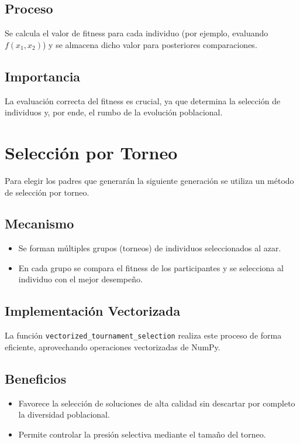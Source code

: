 \subsection*{Proceso}
Se calcula el valor de fitness para cada individuo (por ejemplo, evaluando $f(x_1, x_2)$) y se almacena dicho valor para posteriores comparaciones.

\subsection*{Importancia}
La evaluaci\'on correcta del fitness es crucial, ya que determina la selecci\'on de individuos y, por ende, el rumbo de la evoluci\'on poblacional.

\section{Selecci\'on por Torneo}

Para elegir los padres que generar\'an la siguiente generaci\'on se utiliza un m\'etodo de selecci\'on por torneo.

\subsection*{Mecanismo}
\begin{itemize}
    \item Se forman m\'ultiples grupos (torneos) de individuos seleccionados al azar.
    \item En cada grupo se compara el fitness de los participantes y se selecciona al individuo con el mejor desempe\~no.
\end{itemize}

\subsection*{Implementaci\'on Vectorizada}
La funci\'on \texttt{vectorized\_tournament\_selection} realiza este proceso de forma eficiente, aprovechando operaciones vectorizadas de NumPy.

\subsection*{Beneficios}
\begin{itemize}
    \item Favorece la selecci\'on de soluciones de alta calidad sin descartar por completo la diversidad poblacional.
    \item Permite controlar la presi\'on selectiva mediante el tama\~no del torneo.
\end{itemize}

